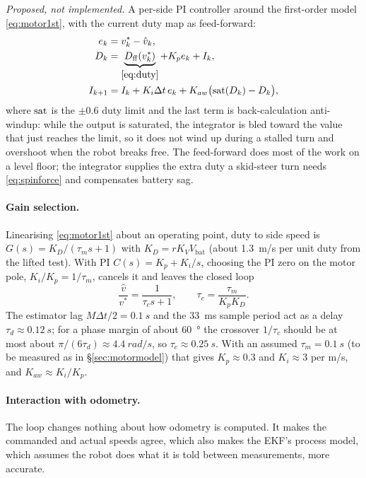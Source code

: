 \emph{Proposed, not implemented.} A per-side PI controller around the
first-order model \eqref{eq:motor1st}, with the current duty map as
feed-forward:
\begin{equation}\label{eq:speedpi}
\begin{aligned}
e_k &= v^\ast_k - \hat v_k,\\
D_k &= \underbrace{D_{\mathrm{ff}}(v^\ast_k)}_{\eqref{eq:duty}}
      + K_p e_k + I_k,\\
I_{k+1} &= I_k + K_i\Delta t\, e_k + K_{aw}\bigl(\operatorname{sat}(D_k)-D_k\bigr),
\end{aligned}
\end{equation}
where $\operatorname{sat}$ is the $\pm0.6$ duty limit and the last term is back-calculation
anti-windup: while the output is saturated, the integrator is bled toward
the value that just reaches the limit, so it does not wind up during a
stalled turn and overshoot when the robot breaks free. The feed-forward does
most of the work on a level floor; the integrator supplies the extra duty a
skid-steer turn needs \eqref{eq:spinforce} and compensates battery sag.

\paragraph{Gain selection.} Linearising \eqref{eq:motor1st} about an
operating point, duty to side speed is $G(s)=K_D/(\tau_m s+1)$ with
$K_D=rK_VV_{\mathrm{bat}}$ (about \SI{1.3}{m/s} per unit duty from the lifted
test). With PI $C(s)=K_p+K_i/s$, choosing the PI zero on the motor pole,
$K_i/K_p=1/\tau_m$, cancels it and leaves the closed loop
\begin{equation}
\frac{\hat v}{v^\ast} = \frac{1}{\tau_c s+1},\qquad \tau_c=\frac{\tau_m}{K_pK_D}.
\end{equation}
The estimator lag $M\Delta t/2=\SI{0.1}{s}$ and the \SI{33}{ms} sample period
act as a delay $\tau_d\approx\SI{0.12}{s}$; for a phase margin of about
\SI{60}{\degree} the crossover $1/\tau_c$ should be at most about
$\pi/(6\tau_d)\approx\SI{4.4}{rad/s}$, so $\tau_c\approx\SI{0.25}{s}$. With
an assumed $\tau_m=\SI{0.1}{s}$ (to be measured as in
\S\ref{sec:motormodel}) that gives $K_p\approx0.3$ and $K_i\approx3$ per
\si{m/s}, and $K_{aw}\approx K_i/K_p$.

\paragraph{Interaction with odometry.} The loop changes nothing about how
odometry is computed. It makes the commanded and actual speeds agree, which
also makes the EKF's process model, which assumes the robot does what it is
told between measurements, more accurate.

